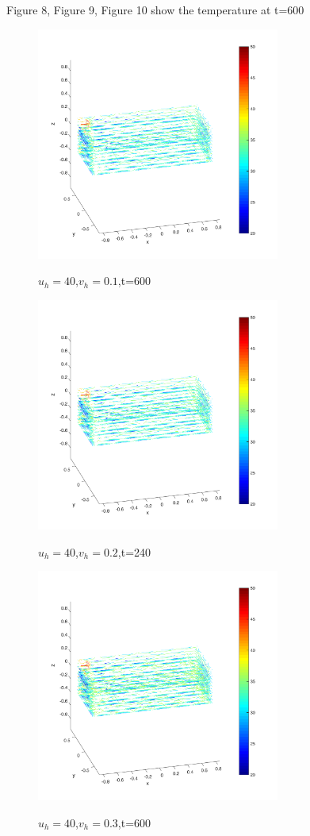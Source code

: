 \documentclass[12pt,a4paper,titlepage]{article}
\begin{document}
Figure 8, Figure 9, Figure 10 show the temperature at t=600
\begin{figure}[htb]
  \centering
  \includegraphics[width=8cm]{6-5.pdf}\\
  \caption{$u_h=40$,$v_h=0.1$,t=600}\label{6-5_p}
\end{figure}

\begin{figure}[htb]
  \centering
  \includegraphics[width=8cm]{10-5.pdf}\\
  \caption{$u_h=40$,$v_h=0.2$,t=240}\label{10-5_p}
\end{figure}

\begin{figure}[htb]
  \centering
  \includegraphics[width=8cm]{11-5.pdf}\\
  \caption{$u_h=40$,$v_h=0.3$,t=600}\label{11-5_p}
\end{figure}
\end{document}
